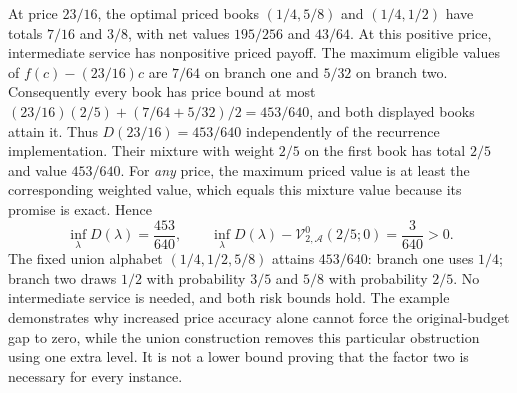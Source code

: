 At price $23/16$, the optimal priced books $(1/4,5/8)$ and $(1/4,1/2)$ have totals $7/16$ and $3/8$, with net values $195/256$ and $43/64$. At this positive price, intermediate service has nonpositive priced payoff. The maximum eligible values of $f(c)-(23/16)c$ are $7/64$ on branch one and $5/32$ on branch two. Consequently every book has price bound at most $(23/16)(2/5)+(7/64+5/32)/2=453/640$, and both displayed books attain it. Thus $D(23/16)=453/640$ independently of the recurrence implementation. Their mixture with weight $2/5$ on the first book has total $2/5$ and value $453/640$. For \emph{any} price, the maximum priced value is at least the corresponding weighted value, which equals this mixture value because its promise is exact. Hence
\[
 \inf_\lambda D(\lambda)=\frac{453}{640},\qquad
 \inf_\lambda D(\lambda)-\mathcal V_{2,\mathcal A}^0(2/5;0)=\frac3{640}>0.
\]
The fixed union alphabet $(1/4,1/2,5/8)$ attains $453/640$: branch one uses $1/4$; branch two draws $1/2$ with probability $3/5$ and $5/8$ with probability $2/5$. No intermediate service is needed, and both risk bounds hold. The example demonstrates why increased price accuracy alone cannot force the original-budget gap to zero, while the union construction removes this particular obstruction using one extra level. It is not a lower bound proving that the factor two is necessary for every instance.
